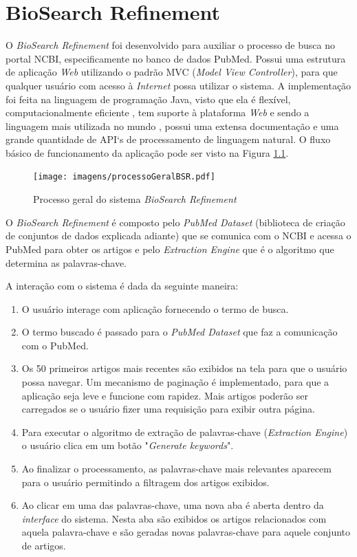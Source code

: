 \chapter{BioSearch Refinement}

O \emph{BioSearch Refinement} foi desenvolvido para auxiliar o processo de busca no portal NCBI, especificamente no banco de dados PubMed. Possui uma estrutura de aplicação \emph{Web} utilizando o padrão MVC (\emph{Model View Controller}), para que qualquer usuário com acesso à \emph{Internet} possa utilizar o sistema. A implementação foi feita na linguagem de programação Java, visto que ela é flexível, computacionalmente eficiente \cite{Oracle2010}, tem suporte à plataforma \emph{Web} e sendo a linguagem mais utilizada no mundo \cite{TIOBE2011}, possui uma extensa documentação e uma grande quantidade de API`s de processamento de linguagem natural. O fluxo básico de funcionamento da aplicação pode ser visto na Figura \ref{fig:1}. 
\begin{figure}[h!]
    \center
    \texttt{[image: imagens/processoGeralBSR.pdf]}
    \caption{Processo geral do sistema \emph{BioSearch Refinement} \label{fig:1}} 
\end{figure}

O \emph{BioSearch Refinement} é composto pelo \emph{PubMed Dataset} (biblioteca de criação de conjuntos de dados explicada adiante) que se comunica com o NCBI e acessa o PubMed para obter os artigos e pelo \emph{Extraction Engine} que é o algoritmo que determina as palavras-chave.

A interação com o sistema é dada da seguinte maneira:

\begin{enumerate}
    \item O usuário interage com aplicação fornecendo o termo de busca.
    \item O termo buscado é passado para o \emph{PubMed Dataset}  que faz a comunicação com o PubMed.
    \item Os 50 primeiros artigos mais recentes são exibidos na tela para que o usuário possa navegar. Um mecanismo de paginação é implementado, para que a aplicação seja leve e funcione com rapidez. Mais artigos poderão ser carregados se o usuário fizer uma requisição para exibir outra página.
    \item Para executar o algoritmo de extração de palavras-chave (\emph{Extraction Engine}) o usuário clica em um botão "\emph{Generate keywords}".
    \item Ao finalizar o processamento, as palavras-chave mais relevantes aparecem para o usuário permitindo a filtragem dos artigos exibidos.
    \item Ao clicar em uma das palavras-chave, uma nova aba é aberta dentro da \emph{interface} do sistema. Nesta aba são exibidos os artigos relacionados com aquela palavra-chave e são geradas novas palavras-chave para aquele conjunto de artigos.
\end{enumerate}

